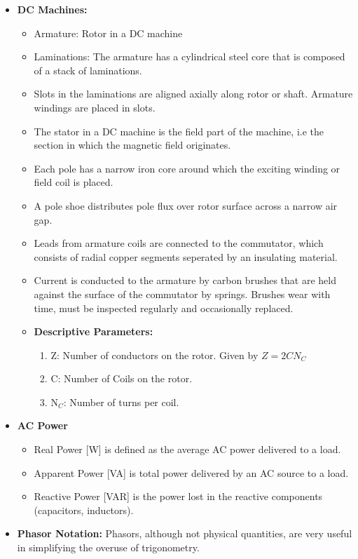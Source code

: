 \documentclass{book}
\begin{document}
\begin{itemize}
	\item \textbf{DC Machines:}
	\begin{itemize}
		\item Armature: Rotor in a DC machine
		\item Laminations: The armature has a cylindrical steel core that is composed of a stack of laminations.
		\item Slots in the laminations are aligned axially along rotor or shaft. Armature windings are placed in slots.
		\item The stator in a DC machine is the field part of the machine, i.e the section in which the magnetic field originates.
		\item Each pole has a narrow iron core around which the exciting winding or field coil is placed.
		\item A pole shoe distributes pole flux over rotor surface across a narrow air gap.
		\item Leads from armature coils are connected to the commutator, which consists of radial copper segments seperated by an insulating material.
		\item Current is conducted to the armature by carbon brushes that are held against the surface of the commutator by springs. Brushes wear with time, must be inspected regularly and occasionally replaced.
		\item \textbf{Descriptive Parameters:}
		\begin{enumerate}
			\item Z: Number of conductors on the rotor. Given by $Z=2C N_C$
			\item C: Number of Coils on the rotor.
			\item N$_C$: Number of turns per coil.
		\end{enumerate}
	\end{itemize}
	\item \textbf{AC Power}
	\begin{itemize}
		\item Real Power [W] is defined as the average AC power delivered to a load. 
		\item Apparent Power [VA] is total power delivered by an AC source to a load.
		\item Reactive Power [VAR] is the power lost in the reactive components (capacitors, inductors). 
	\end{itemize}
	\item \textbf{Phasor Notation:} Phasors, although not physical quantities, are very useful in simplifying the overuse of trigonometry. 

\end{itemize}
\end{document}
